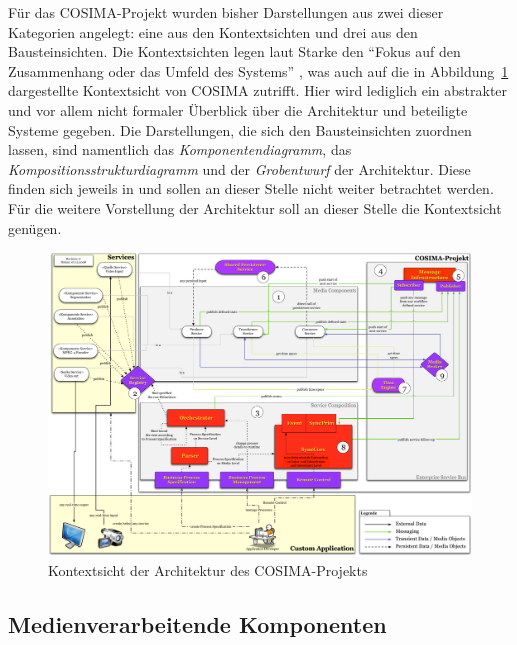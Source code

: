   Für das COSIMA-Projekt wurden bisher Darstellungen aus zwei dieser Kategorien angelegt: eine aus den Kontextsichten und drei aus den Bausteinsichten. Die Kontextsichten legen laut Starke den "`Fokus auf den Zusammenhang oder das Umfeld des Systems"' \citep[S. 87]{effektive_software_architekturen}, was auch auf die in Abbildung~\ref{fig:Kontextsicht_Architektur_COSIMA} dargestellte Kontextsicht von COSIMA zutrifft. Hier wird lediglich ein abstrakter und vor allem nicht formaler Überblick über die Architektur und beteiligte Systeme gegeben. Die Darstellungen, die sich den Bausteinsichten zuordnen lassen, sind namentlich das \emph{Komponentendiagramm}, das \emph{Kompositionsstrukturdiagramm} und der \emph{Grobentwurf} der Architektur. Diese finden sich jeweils in \citep{bericht} und sollen an dieser Stelle nicht weiter betrachtet werden. Für die weitere Vorstellung der Architektur soll an dieser Stelle die Kontextsicht genügen.

  \begin{figure}
    \centering
    \includegraphics[width=\textwidth]{images/Kontextsicht_Architektur_COSIMA}
    \caption{Kontextsicht der Architektur des COSIMA-Projekts}
    \label{fig:Kontextsicht_Architektur_COSIMA}
  \end{figure}


\subsection{Medienverarbeitende Komponenten} %
\label{sub:medienverarbeitende_komponenten}

